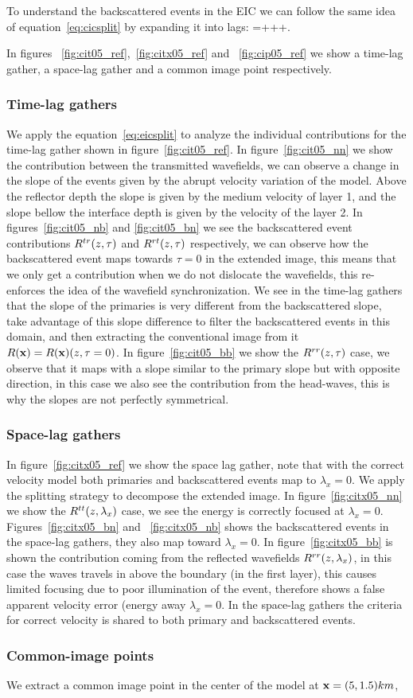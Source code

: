 To understand the backscattered events in the EIC we can follow the same idea of equation~\ref{eq:cicsplit} by expanding it
into lags:
\beq
\Re=+++.
\label{eq:eicsplit}
\eeq

In figures ~\ref{fig:cit05_ref},~\ref{fig:citx05_ref} and ~\ref{fig:cip05_ref} we show a time-lag gather, a space-lag gather
 and a common image point respectively. 

\subsubsection{Time-lag gathers}

We apply the equation~\ref{eq:eicsplit} to analyze the individual contributions
for the time-lag gather shown in figure~\ref{fig:cit05_ref}. In figure~\ref{fig:cit05_nn} we show the contribution between
the transmitted wavefields, we can observe a change in the slope of the events given by the abrupt velocity variation of the model. 
Above the reflector depth the slope is given by the medium velocity of layer 1, and the slope bellow the interface depth is given
 by the velocity of the layer 2. In figures~\ref{fig:cit05_nb} and \ref{fig:cit05_bn} we see the backscattered
 event contributions $R^{tr}(z,\tau)$ and $R^{rt}(z,\tau)$ respectively, we can observe how the backscattered event maps towards $\tau=0$
in the extended image, this means that we only get a contribution when we do not dislocate the wavefields, this re-enforces
the idea of the wavefield synchronization. We see in the time-lag gathers that the slope of the primaries is very different
from the backscattered slope, ~\cite{kaelin:3125} take advantage of this slope difference to filter the backscattered 
events in this domain, and then extracting the conventional image from it $R({\bf x})=R({\bf x})(z,\tau=0)$. In figure~\ref{fig:cit05_bb} 
we show the $R^{rr}(z,\tau)$ case, we observe that it maps with a slope similar to the primary slope but with opposite direction, 
in this case we also see the contribution from the head-waves, this is why the slopes are not perfectly symmetrical.

\subsubsection{Space-lag gathers}

In figure~\ref{fig:citx05_ref} we show the space lag gather, note that with the correct velocity model both primaries and
backscattered events map to $\lambda_x=0$. We apply the splitting strategy to decompose the extended image. In figure~\ref{fig:citx05_nn}
we show the $R^{tt}(z,\lambda_x)$ case, we see the energy is correctly focused at $\lambda_x=0$. Figures~\ref{fig:citx05_bn} and ~\ref{fig:citx05_nb}
shows the backscattered events in the space-lag gathers, they also map toward $\lambda_x=0$. In figure~\ref{fig:citx05_bb} is shown
the contribution coming from the reflected wavefields $R^{rr}(z,\lambda_x)$, in this case the waves travels in above the boundary (in the first layer),
this causes limited focusing due to poor illumination of the event, therefore shows a false apparent velocity error (energy away $\lambda_x=0$. 
In the space-lag gathers the criteria for correct velocity is shared to both primary and backscattered events.

\subsubsection{Common-image points}

We extract a common image point in the center of the model at ${\bf x}=(5,1.5)km$, 
